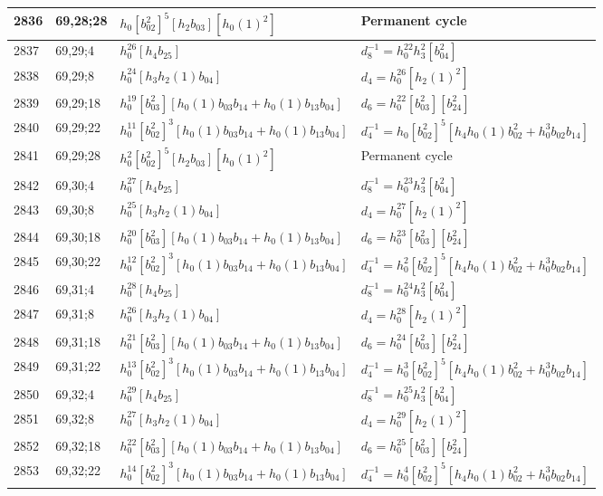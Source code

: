 \documentclass{article}
\begin{document}
\begin{longtable}{|l|l|>{\raggedright\arraybackslash}p{6cm}|>{\raggedright\arraybackslash}p{6cm}|}
\hline
2836 & 69,28;28 & $h_0[b_{02}^2]^5[h_2b_{03}][h_0(1)^2]$ & Permanent cycle\\
\hline
2837 & 69,29;4 & $h_0^{26}[h_4b_{25}]$ & $d_{8}^{-1}=h_0^{22}h_3^2[b_{04}^2]$\\
\hline
2838 & 69,29;8 & $h_0^{24}[h_3h_2(1)b_{04}]$ &$d_{4}=h_0^{26}[h_2(1)^2]$\\
\hline
2839 & 69,29;18 & $h_0^{19}[b_{03}^2][h_0(1)b_{03}b_{14} + h_0(1)b_{13}b_{04}]$ &$d_{6}=h_0^{22}[b_{03}^2][b_{24}^2]$\\
\hline
2840 & 69,29;22 & $h_0^{11}[b_{02}^2]^3[h_0(1)b_{03}b_{14} + h_0(1)b_{13}b_{04}]$ & $d_{4}^{-1}=h_0[b_{02}^2]^5[h_4h_0(1)b_{02}^2 + h_0^3b_{02}b_{14}]$\\
\hline
2841 & 69,29;28 & $h_0^2[b_{02}^2]^5[h_2b_{03}][h_0(1)^2]$ & Permanent cycle\\
\hline
2842 & 69,30;4 & $h_0^{27}[h_4b_{25}]$ & $d_{8}^{-1}=h_0^{23}h_3^2[b_{04}^2]$\\
\hline
2843 & 69,30;8 & $h_0^{25}[h_3h_2(1)b_{04}]$ &$d_{4}=h_0^{27}[h_2(1)^2]$\\
\hline
2844 & 69,30;18 & $h_0^{20}[b_{03}^2][h_0(1)b_{03}b_{14} + h_0(1)b_{13}b_{04}]$ &$d_{6}=h_0^{23}[b_{03}^2][b_{24}^2]$\\
\hline
2845 & 69,30;22 & $h_0^{12}[b_{02}^2]^3[h_0(1)b_{03}b_{14} + h_0(1)b_{13}b_{04}]$ & $d_{4}^{-1}=h_0^2[b_{02}^2]^5[h_4h_0(1)b_{02}^2 + h_0^3b_{02}b_{14}]$\\
\hline
2846 & 69,31;4 & $h_0^{28}[h_4b_{25}]$ & $d_{8}^{-1}=h_0^{24}h_3^2[b_{04}^2]$\\
\hline
2847 & 69,31;8 & $h_0^{26}[h_3h_2(1)b_{04}]$ &$d_{4}=h_0^{28}[h_2(1)^2]$\\
\hline
2848 & 69,31;18 & $h_0^{21}[b_{03}^2][h_0(1)b_{03}b_{14} + h_0(1)b_{13}b_{04}]$ &$d_{6}=h_0^{24}[b_{03}^2][b_{24}^2]$\\
\hline
2849 & 69,31;22 & $h_0^{13}[b_{02}^2]^3[h_0(1)b_{03}b_{14} + h_0(1)b_{13}b_{04}]$ & $d_{4}^{-1}=h_0^3[b_{02}^2]^5[h_4h_0(1)b_{02}^2 + h_0^3b_{02}b_{14}]$\\
\hline
2850 & 69,32;4 & $h_0^{29}[h_4b_{25}]$ & $d_{8}^{-1}=h_0^{25}h_3^2[b_{04}^2]$\\
\hline
2851 & 69,32;8 & $h_0^{27}[h_3h_2(1)b_{04}]$ &$d_{4}=h_0^{29}[h_2(1)^2]$\\
\hline
2852 & 69,32;18 & $h_0^{22}[b_{03}^2][h_0(1)b_{03}b_{14} + h_0(1)b_{13}b_{04}]$ &$d_{6}=h_0^{25}[b_{03}^2][b_{24}^2]$\\
\hline
2853 & 69,32;22 & $h_0^{14}[b_{02}^2]^3[h_0(1)b_{03}b_{14} + h_0(1)b_{13}b_{04}]$ & $d_{4}^{-1}=h_0^4[b_{02}^2]^5[h_4h_0(1)b_{02}^2 + h_0^3b_{02}b_{14}]$\\

\end{longtable}
\end{document}
